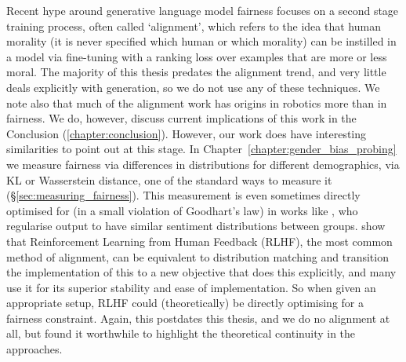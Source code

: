 Recent hype around generative language model fairness focuses on a second stage training process, often called `alignment', which refers to the idea that human morality (it is never specified which human or which morality) can be instilled in a model via fine-tuning with a ranking loss over examples that are more or less moral. The majority of this thesis predates the alignment trend, and very little deals explicitly with generation, so we do not use any of these techniques. We note also that much of the alignment work has origins in robotics more than in fairness. We do, however, discuss current implications of this work in the Conclusion (\ref{chapter:conclusion}). 
However, our work does have interesting similarities to point out at this stage. In Chapter~\ref{chapter:gender_bias_probing} we measure fairness via differences in distributions for different demographics, via KL or Wasserstein distance, one of the standard ways to measure it (\S \ref{sec:measuring_fairness}). This measurement is even sometimes directly optimised for (in a small violation of Goodhart's law) in works like \citet{huang-etal-2020-reducing}, who regularise output to have similar sentiment distributions between groups. \citet{korbak2022on} show that Reinforcement Learning from Human Feedback (RLHF), the most common method of alignment, can be equivalent to distribution matching and \citet{rafailov2023direct} transition the implementation of this to a new objective that does this explicitly, and many use it for its superior stability and ease of implementation. So when given an appropriate setup, RLHF could (theoretically) be directly optimising for a fairness constraint. Again, this postdates this thesis, and we do no alignment at all, but found it worthwhile to highlight the theoretical continuity in the approaches. 

